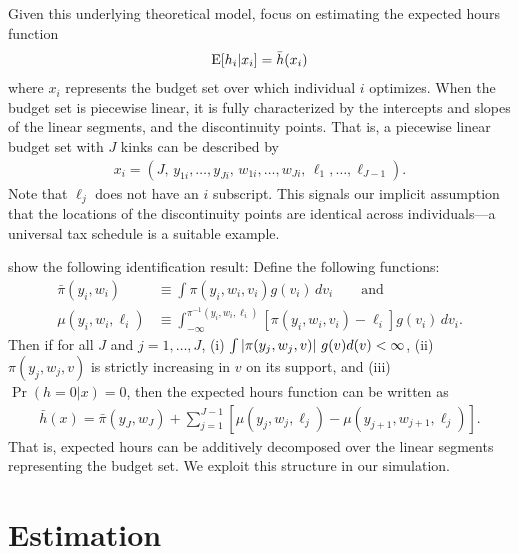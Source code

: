 \documentclass[11pt,letterpaper]{article}                  %
\begin{document}
Given this underlying theoretical model, \citet{Blomquist2002} focus on estimating the expected hours function
\begin{align*}
	\operatorname{E} [h_i | x_i] = \bar{h}(x_i)
\end{align*}
where $x_i$ represents the budget set over which individual $i$ optimizes.
When the budget set is piecewise linear, it is fully characterized by the intercepts and slopes of the linear segments, and the discontinuity points.
That is, a piecewise linear budget set with $J$ kinks can be described by
\begin{align*}
	x_i = (J, \, y_{1i}, \ldots, y_{Ji}, \, w_{1i}, \ldots, w_{Ji}, \, \ell_{1}, \ldots, \ell_{J-1}).
\end{align*}
Note that $\ell_{j}$ does not have an $i$ subscript.
This signals our implicit assumption that the locations of the discontinuity points are identical across individuals---a universal tax schedule is a suitable example.

\citet{Blomquist2002} show the following identification result:
Define the following functions:
\begin{align*}
	\bar{\pi} (y_i, w_i) &\equiv \int \pi(y_i, w_i, v_i) g(v_i) \, d v_i \qquad \text{and} \\
	\mu(y_i, w_i, \ell_i) &\equiv \int_{-\infty}^{\pi^{-1}(y_i, w_i, \ell_i)} \left[ \pi (y_i, w_i, v_i) - \ell_i \right] g(v_i) \, d v_i.
\end{align*}
Then if for all $J$ and $j = 1, \ldots, J$, (i) $\int \left\lvert\pi (y_j, w_j, v)\right\rvert \, g(v) d(v) < \infty$, (ii) $\pi(y_j, w_j, v)$ is strictly increasing in $v$ on its support, and (iii) $\Pr (h=0 | x) = 0$, then the expected hours function can be written as
\begin{align*}
	\bar{h} (x) = \bar{\pi} (y_J, w_J) + \sum_{j=1}^{J-1} \left[ \mu(y_j, w_j, \ell_j) - \mu(y_{j+1}, w_{j+1}, \ell_j) \right].
\end{align*}
That is, expected hours can be additively decomposed over the linear segments representing the budget set.
We exploit this structure in our simulation.


\section{Estimation}
\label{sec:estimation}
\end{document}
